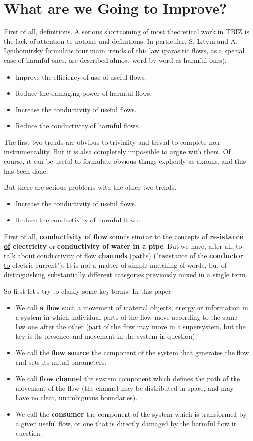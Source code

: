 \documentclass[a4paper,11pt]{article}
\begin{document}
\section*{What are we Going to Improve?}

First of all, definitions. A serious shortcoming of most theoretical work in
TRIZ is the lack of attention to notions and definitions.  In particular,
S. Litvin and A. Lyubomirsky formulate four main trends of this law (parasitic
flows, as a special case of harmful ones, are described almost word by word
as harmful ones):
\begin{itemize}
\item Improve the efficiency of use of useful flows.
\item Reduce the damaging power of harmful flows.
\item Increase the conductivity of useful flows.
\item Reduce the conductivity of harmful flows.
\end{itemize}
The first two trends are obvious to triviality and trivial to complete
non-instrumentality. But it is also completely impossible to argue with them.
Of course, it can be useful to formulate obvious things explicitly as axioms,
and this has been done.

But there are serious problems with the other two trends.
\begin{itemize}
\item Increase the conductivity of useful flows.
\item Reduce the conductivity of harmful flows.
\end{itemize}
First of all, \textbf{conductivity of flow} sounds similar to the concepts of
\textbf{resistance \underline{of} electricity} or \textbf{conductivity of
  water in a pipe}.  But we have, after all, to talk about conductivity of
flow \textbf{channels} (paths) ("resistance of the \textbf{conductor}
\underline{to} electric current"). It is not a matter of simple matching of
words, but of distinguishing substantially different categories previously
mixed in a single term.

So first let's try to clarify some key terms.  In this paper
\begin{itemize}
\item We call \textbf{a flow} such a movement of material objects, energy or
  information in a system in which individual parts of the flow move according
  to the same law one after the other (part of the flow may move in a
  supersystem, but the key is its presence and movement in the system in
  question).
\item We call the \textbf{flow source} the component of the system that
  generates the flow and sets its initial parameters.
\item We call \textbf{flow channel} the system component which defines the
  path of the movement of the flow (the channel may be distributed in space,
  and may have no clear, unambiguous boundaries).
\item We call the \textbf{consumer} the component of the system which
  is transformed by a given useful flow, or one that is directly damaged by
  the harmful flow in question.
\end{itemize}
\end{document}
